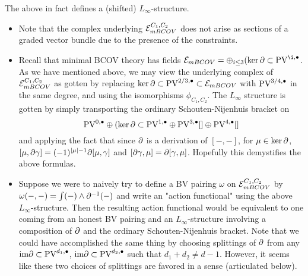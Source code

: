 \documentclass[11pt]{article}
\begin{document}
\begin{prop}
The above in fact defines a (shifted) $L_\infty$-structure.
\end{prop}

\begin{rmk}
\begin{itemize}
\item Note that the complex underlying $\mathcal{E}_{mBCOV}^{C_1,C_2}$ does not arise as sections of a graded vector bundle due to the presence of the constraints.
\item Recall that minimal BCOV theory has fields $\mc E_{mBCOV}=\oplus_{i\leq 3} (\ker\del\subset\PV^{\i,\bullet}$. As we have mentioned above, we may view the underlying complex of $\mathcal{E}_{mBCOV}^{C_1,C_2}$ as gotten by replacing $\ker\partial\subset\text{PV}^{2/3,\bullet}\subset\mathcal{E}_{mBCOV}$ with $\text{PV}^{3/4,\bullet}$ in the same degree, and using the isomorphisms $\phi_{C_1,C_2}$. The $L_\infty$ structure is gotten by simply transporting the ordinary Schouten-Nijenhuis bracket on \[\text{PV}^{0,\bullet}\oplus(\ker\partial\subset\text{PV}^{1,\bullet}\oplus\text{PV}^{3,\bullet}[]\oplus\text{PV}^{4,\bullet}[]\] and applying the fact that since $\partial$ is a derivation of $[-,-]$, for $\mu\in\ker\partial$, $[\mu,\partial\gamma]=(-1)^{|\mu|-1}\partial[\mu,\gamma]$ and $[\partial\gamma,\mu]=\partial[\gamma,\mu]$. Hopefully this demystifies the above formulas.
\item Suppose we were to naively try to define a BV pairing $\omega$ on $\mathcal{E}_{mBCOV}^{C_1,C_2}$ by $\omega(-,-)=\int (-)\wedge\partial^{-1}(-)$ and write an "action functional" using the above $L_\infty$-structure. Then the resulting action functional would be equivalent to one coming from an honest BV pairing and an $L_\infty$-structure involving a composition of $\partial$ and the ordinary Schouten-Nijenhuis bracket. Note that we could have accomplished the same thing by choosing splittings of $\partial$ from any $\text{im}\partial\subset \text{PV}^{d_1,\bullet}$, $\text{im}\partial\subset\text{PV}^{d_2,\bullet}$ such that $d_1+d_2\neq d-1$. However, it seems like these two choices of splittings are favored in a sense (articulated below). 
\end{itemize}
\end{rmk}
\end{document}
